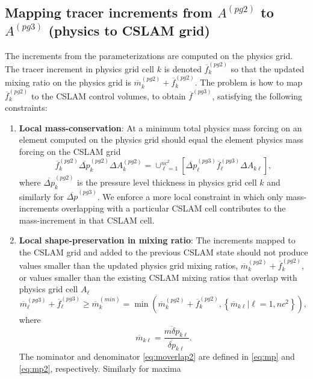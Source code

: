 \subsection{Mapping tracer increments from $A^{(pg2)}$ to $A^{(pg3)}$ (physics to CSLAM grid)}\label{sec:pgtonc}
The increments from the parameterizations are computed on the physics grid. The tracer increment in physics grid cell $k$ is denoted $\overline{f}_k^{(pg2)}$ so that the updated mixing ratio on the physics grid is ${\overline{m}}^{(pg2)}_k+\overline{f}_k^{(pg2)}$. The problem is how to map $\overline{f}_k^{(pg2)}$ to the CSLAM control volumes, to obtain ${\overline{f}}^{(pg3)}$, satisfying the following constraints:
\begin{enumerate}
\item {\bf{Local mass-conservation}}: At a minimum total physics mass forcing on an element computed on the physics grid should equal the element physics mass forcing on the CSLAM grid
\begin{equation}
{\overline{f}}_k^{(pg2)}{\overline{\Delta p}}^{(pg2)}_k\Delta A_k^{(pg2)}=\cup_{\ell=1}^{nc^2}\left[{\overline{\Delta p}}^{(pg3)}_\ell {\overline{f}}^{(pg3)}_\ell\Delta A_{k\ell}\right],
\end{equation}
where $\overline{\Delta p}^{(pg2)}_k$ is the pressure level thickness in physics grid cell $k$ and similarly for $\overline{\Delta p}^{(pg3)}$. We enforce a more local constraint in which only mass-increments overlapping with a particular CSLAM cell contributes to the mass-increment in that CSLAM cell.
\item {\bf{Local shape-preservation in mixing ratio}}: The increments mapped to the CSLAM grid and added to the previous CSLAM state should not produce values smaller than the updated physics grid mixing ratios, ${\overline{m}}^{(pg2)}_k+\overline{f}_k^{(pg2)}$, or values smaller than the existing CSLAM mixing ratios that overlap with physics grid cell $A_\ell$
\begin{equation}
\label{eq:min}
\overline{m}^{(pg3)}_\ell+{\overline{f}}^{(pg3)}_\ell \ge \overline{m}^{(min)}_k=\min \left( {\overline{m}}^{(pg2)}_k+{\overline{f}}_k^{(pg2)},\left\{ {\overline{m}}_{k\ell} |\ell=1,nc^2\right\} \right),
\end{equation}
where
\begin{equation}
\label{eq:moverlap2}
\overline{m}_{k\ell}=\frac{\overline{m\delta p}_{k\ell}}{\overline{\delta p}_{k\ell}}.
\end{equation}
The nominator and denominator \eqref{eq:moverlap2} are defined in \eqref{eq:mp} and \eqref{eq:mp2}, respectively. Similarly for maxima

\end{enumerate}
